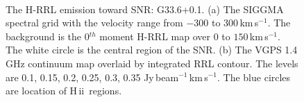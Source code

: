 \documentclass[manuscript]{aastex61}
\newcommand{\hii}{{\rm H\,}{{\sc ii}}}
\newcommand{\kms}{\,km\,s$^{-1}$}
\begin{document}
\begin{figure}[H]
	\centering
	\\  
	\caption{The H-RRL emission toward SNR: G33.6+0.1.
	(a) The SIGGMA spectral grid with the velocity range from $-300$ to $300$\kms.
	The background is the 0$^{th}$ moment H-RRL map over $0$ to $150$\kms.
	The white circle is the central region of the SNR.
	(b) The VGPS 1.4 GHz continuum map overlaid by integrated RRL contour.
	The levels are 0.1, 0.15, 0.2, 0.25, 0.3, 0.35 Jy\,beam$^{-1}$\kms.
	The blue circles are location of \hii\ regions.
	}
	\label{fig_snr-g336}
\end{figure}
\end{document}
